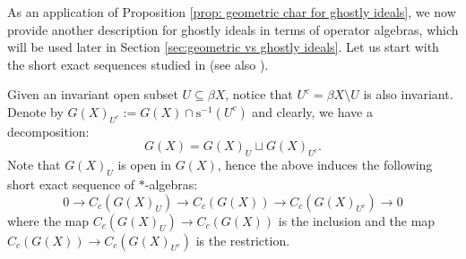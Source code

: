 \documentclass[12pt, a4paper]{amsart}
\numberwithin{equation}{section}
\theoremstyle{definition}
\theoremstyle{remark}
\newtheorem{rem}[thm]{Remark}
\def\s{\mathrm{s}}
\begin{document}


As an application of Proposition \ref{prop: geometric char for ghostly ideals}, we now provide another description for ghostly ideals in terms of operator algebras, which will be used later in Section \ref{sec:geometric vs ghostly ideals}. Let us start with the short exact sequences studied in \cite{HLS02} (see also \cite[Section 2]{FW14}). 


Given an invariant open subset $U \subseteq \beta X$, notice that $U^c=\beta X \setminus U$ is also invariant. Denote by $G(X)_{U^c}:=G(X) \cap \s^{-1}(U^c)$ and clearly, we have a decomposition:
\[
G(X) = G(X)_U \sqcup G(X)_{U^c}.
\]
Note that $G(X)_U$ is open in $G(X)$, hence the above induces the following short exact sequence of $\ast$-algebras:
\begin{equation}\label{EQ: short exact seq. for alg.}
0 \longrightarrow C_c(G(X)_U) \longrightarrow C_c(G(X)) \longrightarrow C_c(G(X)_{U^c}) \longrightarrow 0
\end{equation}
where the map $C_c(G(X)_U) \longrightarrow C_c(G(X))$ is the inclusion and the map $C_c(G(X)) \longrightarrow C_c(G(X)_{U^c})$ is the restriction. 
\end{document}
